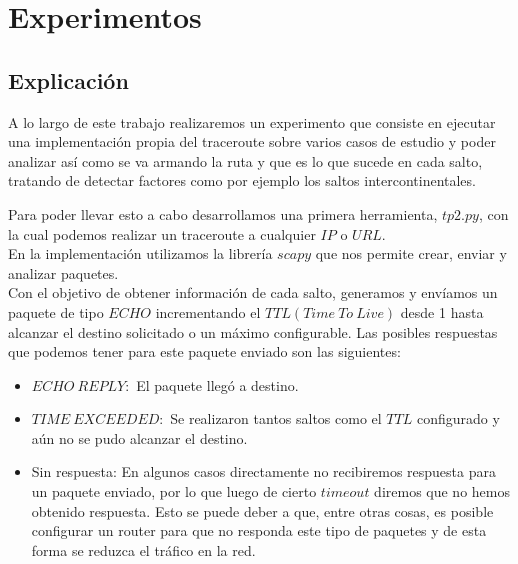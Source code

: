 \section{Experimentos}

\subsection{Explicación}

A lo largo de este trabajo realizaremos un experimento que consiste en ejecutar una implementación propia del traceroute sobre varios casos de estudio y poder analizar así como se va armando la ruta y que es lo que sucede en cada salto, tratando de detectar factores como por ejemplo los saltos intercontinentales.

Para poder llevar esto a cabo desarrollamos una primera herramienta, $tp2.py$, con la cual podemos realizar un traceroute a cualquier $IP$ o $URL$. \\
En la implementación utilizamos la librería $scapy$ que nos permite crear, enviar y analizar paquetes. \\
Con el objetivo de obtener información de cada salto, generamos y envíamos un paquete de tipo $ECHO$ incrementando el $TTL (Time\ To\ Live)$ desde 1 hasta alcanzar el destino solicitado o un máximo configurable. Las posibles respuestas que podemos tener para este paquete enviado son las siguientes:
\begin{itemize}
	\item $ECHO\ REPLY:$ El paquete llegó a destino. 
	\item $TIME\ EXCEEDED:$ Se realizaron tantos saltos como el $TTL$ configurado y aún no se pudo alcanzar el destino.
	\item Sin respuesta: En algunos casos directamente no recibiremos respuesta para un paquete enviado, por lo que luego de cierto $timeout$ diremos que no hemos obtenido respuesta. Esto se puede deber a que, entre otras cosas, es posible configurar un router para que no responda este tipo de paquetes y de esta forma se reduzca el tráfico en la red.
\end{itemize}

